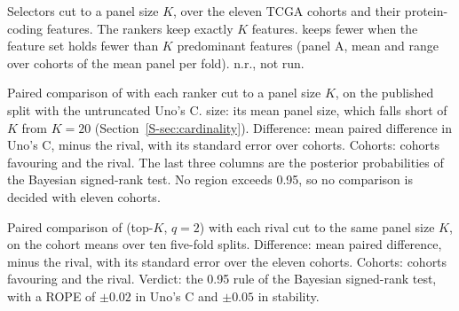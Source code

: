 \begin{table}[htbp]
\centering\footnotesize
\caption{Selectors cut to a panel size $K$, over the eleven TCGA cohorts and their
protein-coding features. The rankers keep exactly $K$ features.  keeps
fewer when the feature set holds fewer than $K$ predominant features (panel A, mean and
range over cohorts of the mean panel per fold). n.r., not run.}
\label{S-tab:cardinality}

\end{table}

\begin{table}[htbp]
\centering\footnotesize
\caption{Paired comparison of  with each ranker cut to a panel size $K$, on
the published split with the untruncated Uno's C.
 size: its mean panel size, which falls short of $K$ from $K = 20$
(Section~\ref{S-sec:cardinality}). Difference: mean paired difference in Uno's C,
 minus the rival, with its standard error over cohorts. Cohorts: cohorts favouring  and the rival. The
last three columns are the posterior probabilities of the Bayesian signed-rank test. No
region exceeds 0.95, so no comparison is decided with eleven cohorts.}
\label{S-tab:cardinf}

\end{table}

\begin{table}[htbp]
\centering\footnotesize
\caption{Paired comparison of  (top-$K$, $q = 2$) with each rival cut to the
same panel size $K$, on the cohort means over ten five-fold splits. Difference: mean paired
difference,  minus the rival, with its standard error over the eleven cohorts.
Cohorts: cohorts favouring  and the rival. Verdict: the 0.95 rule of the
Bayesian signed-rank test, with a ROPE of $\pm 0.02$ in Uno's C and $\pm 0.05$ in
stability.}
\label{S-tab:rcvmatched}

\end{table}

